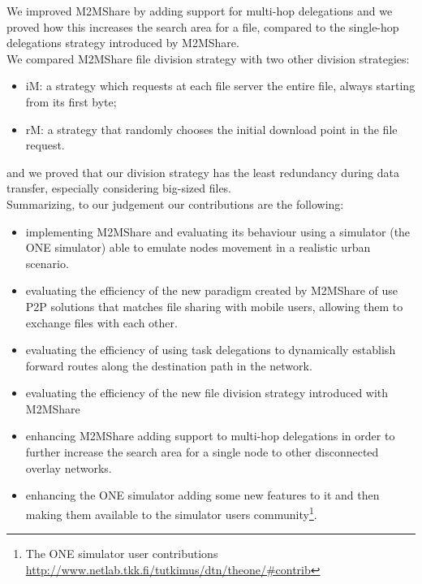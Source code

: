 We improved M2MShare by adding support for multi-hop delegations and we proved how this increases the search area for a file, compared to the single-hop delegations strategy introduced by M2MShare.
\\

We compared M2MShare file division strategy with two other division strategies:
\begin{itemize}
\item iM: a strategy which requests at each file server the entire file, always starting from its first byte;
\item rM: a strategy that randomly chooses the initial download point in the file request.
\end{itemize}
and we proved that our division strategy has the least redundancy during data transfer, especially considering big-sized files.
\\

Summarizing, to our judgement our contributions are the following:
\begin{itemize}
\item implementing M2MShare and evaluating its behaviour using a simulator (the ONE simulator) able to emulate nodes movement in a realistic urban scenario.
\item evaluating the efficiency of the new paradigm created by M2MShare of use P2P solutions that matches file sharing with mobile users, allowing them to exchange files with each other.
\item evaluating the efficiency of using task delegations to dynamically establish forward routes along the destination path in the network.
\item evaluating the efficiency of the new file division strategy introduced with M2MShare 
\item enhancing M2MShare adding support to multi-hop delegations in order to further increase the search area for a single node to other disconnected overlay networks.
\item enhancing the ONE simulator adding some new features to it and then making them available to the simulator users community\footnote{The ONE simulator user contributions \href{http://www.netlab.tkk.fi/tutkimus/dtn/theone/\#contrib}{http://www.netlab.tkk.fi/tutkimus/dtn/theone/\#contrib}}.
\end{itemize}



